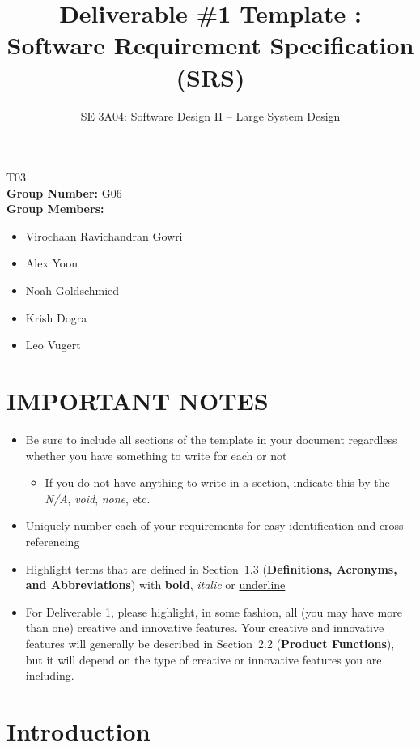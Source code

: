 \documentclass[]{article}
\title{Deliverable \#1 Template : Software Requirement Specification (SRS)}
\author{SE 3A04: Software Design II -- Large System Design}
\date{}
\begin{document}
\maketitle
{} T03\\
{\bf Group Number:} G06 \\
{\bf Group Members:}
\begin{itemize}
	\item Virochaan Ravichandran Gowri
	\item Alex Yoon
	\item Noah Goldschmied
	\item Krish Dogra
	\item Leo Vugert
\end{itemize}

\section*{IMPORTANT NOTES}
\begin{itemize}
	\item Be sure to include all sections of the template in your document regardless whether you have something to write for each or not
	      \begin{itemize}
		      \item If you do not have anything to write in a section, indicate this by the \emph{N/A}, \emph{void}, \emph{none}, etc.
	      \end{itemize}
	\item Uniquely number each of your requirements for easy identification and cross-referencing
	\item Highlight terms that are defined in Section~1.3 (\textbf{Definitions, Acronyms, and Abbreviations}) with \textbf{bold}, \emph{italic} or \underline{underline}
	\item For Deliverable 1, please highlight, in some fashion, all (you may have more than one) creative and innovative features. Your creative and innovative features will generally be described in Section~2.2 (\textbf{Product Functions}), but it will depend on the type of creative or innovative features you are including.
\end{itemize}

\newpage
\section{Introduction}
\label{sec:introduction}
\end{document}
